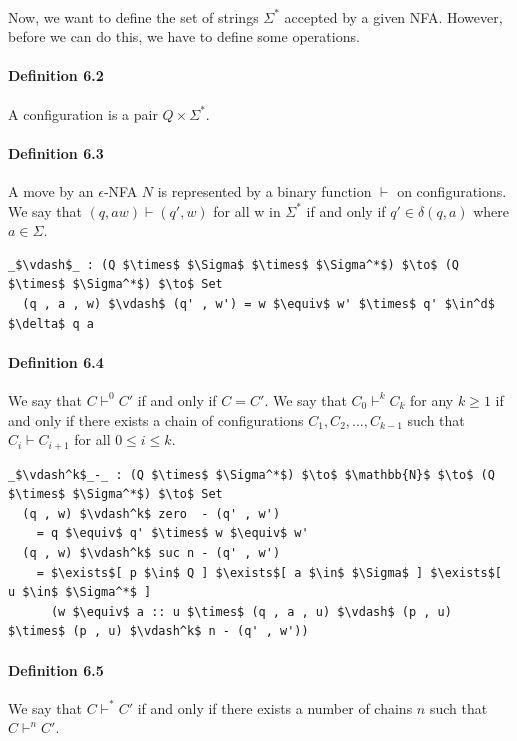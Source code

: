 \documentclass[twoside,openright,final]{bhamthesis}
\begin{document}
\paragraph{} Now, we want to define the set of strings \(\Sigma^*\) accepted by a given
NFA. However, before we can do this, we have to define
some operations.

\paragraph{Definition 6.2} A configuration is a pair \(Q \times
\Sigma^*\). 

\paragraph{Definition 6.3} A move by an \(\epsilon\)-NFA \(N\) is
represented by a binary function \(\vdash\) on configurations. We say
that \((q, aw) \vdash (q' , w)\) for all w in \(\Sigma^*\)
if and only if \(q' \in \delta (q , a)\) where \(a \in \Sigma\). 

\begin{lstlisting}[mathescape=true]
  _$\vdash$_ : (Q $\times$ $\Sigma$ $\times$ $\Sigma^*$) $\to$ (Q $\times$ $\Sigma^*$) $\to$ Set
  (q , a , w) $\vdash$ (q' , w') = w $\equiv$ w' $\times$ q' $\in^d$ $\delta$ q a
\end{lstlisting}

\paragraph{Definition 6.4} We say that \(C \vdash^0 C'\) if and only
if \(C = C'\). We say that \(C_0 \vdash^k C_k\) for any \(k \geq 1\) if and only if there exists a chain of
configurations \(C_1, C_2, ..., C_{k-1}\) such that \(C_i \vdash
C_{i+1}\) for all \(0 \leq i \leq k\). 

\begin{lstlisting}[mathescape=true]
  _$\vdash^k$_-_ : (Q $\times$ $\Sigma^*$) $\to$ $\mathbb{N}$ $\to$ (Q $\times$ $\Sigma^*$) $\to$ Set
  (q , w) $\vdash^k$ zero  - (q' , w')
    = q $\equiv$ q' $\times$ w $\equiv$ w'
  (q , w) $\vdash^k$ suc n - (q' , w') 
    = $\exists$[ p $\in$ Q ] $\exists$[ a $\in$ $\Sigma$ ] $\exists$[ u $\in$ $\Sigma^*$ ]
      (w $\equiv$ a :: u $\times$ (q , a , u) $\vdash$ (p , u) $\times$ (p , u) $\vdash^k$ n - (q' , w'))
\end{lstlisting}

\paragraph{Definition 6.5} We say that \(C \vdash^* C'\) if and only
if there exists a number of chains \(n\) such that \(C \vdash^n C'\). 
\end{document}
